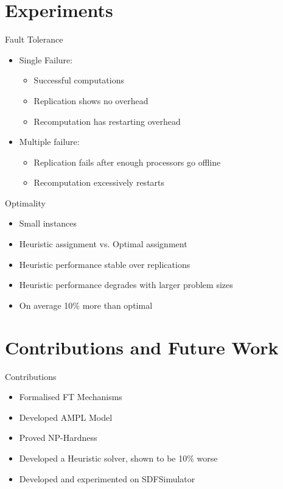 \documentclass{beamer}
\begin{document}
\section{Experiments}

\begin{frame}{Fault Tolerance}
\begin{itemize}
	\item Single Failure:
	\begin{itemize}
		\item Successful computations
		\item Replication shows no overhead
		\item Recomputation has restarting overhead
	\end{itemize}
	\item Multiple failure:
	\begin{itemize}
		\item Replication fails after enough processors go offline
		\item Recomputation excessively restarts
	\end{itemize}
\end{itemize}
\end{frame}

\begin{frame}{Optimality}
\begin{itemize}
	\item Small instances
	\item Heuristic assignment vs. Optimal assignment
	\item Heuristic performance stable over replications
	\item Heuristic performance degrades with larger problem sizes
	\item On average 10\% more than optimal
\end{itemize}
\end{frame}

\section{Contributions and Future Work}

\begin{frame}{Contributions}
\begin{itemize}
	\item Formalised FT Mechanisms
	\item Developed AMPL Model
	\item Proved NP-Hardness
	\item Developed a Heuristic solver, shown to be 10\% worse
	\item Developed and experimented on SDFSimulator
\end{itemize}
\end{frame}
\end{document}
